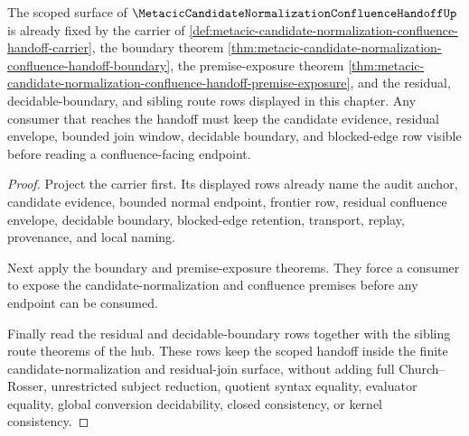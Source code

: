 \begin{theorem}
\label{thm:metacic-candidate-normalization-confluence-scoped-closure-route}
The scoped surface of $\MetacicCandidateNormalizationConfluenceHandoffUp$ is already fixed by the carrier of \autoref{def:metacic-candidate-normalization-confluence-handoff-carrier}, the boundary theorem \autoref{thm:metacic-candidate-normalization-confluence-handoff-boundary}, the premise-exposure theorem \autoref{thm:metacic-candidate-normalization-confluence-handoff-premise-exposure}, and the residual, decidable-boundary, and sibling route rows displayed in this chapter. Any consumer that reaches the handoff must keep the candidate evidence, residual envelope, bounded join window, decidable boundary, and blocked-edge row visible before reading a confluence-facing endpoint.
\end{theorem}
\begin{proof}
Project the carrier first. Its displayed rows already name the audit anchor, candidate evidence, bounded normal endpoint, frontier row, residual confluence envelope, decidable boundary, blocked-edge retention, transport, replay, provenance, and local naming.

Next apply the boundary and premise-exposure theorems. They force a consumer to expose the candidate-normalization and confluence premises before any endpoint can be consumed.

Finally read the residual and decidable-boundary rows together with the sibling route theorems of the hub. These rows keep the scoped handoff inside the finite candidate-normalization and residual-join surface, without adding full Church--Rosser, unrestricted subject reduction, quotient syntax equality, evaluator equality, global conversion decidability, closed consistency, or kernel consistency.
\end{proof}
